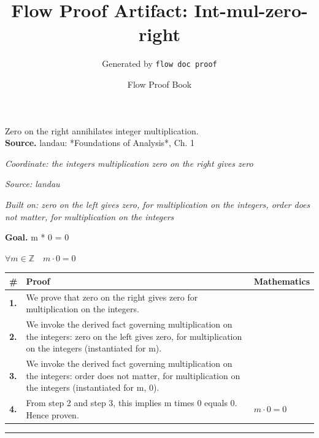 \documentclass[11pt]{article}
\title{Flow Proof Artifact: Int-mul-zero-right}
\author{Generated by \texttt{flow doc proof}}
\date{Flow Proof Book}
\theoremstyle{definition}
\begin{document}
\maketitle
Zero on the right annihilates integer multiplication.\\[0.5em]
\textbf{Source.} landau: *Foundations of Analysis*, Ch. 1\\[0.5em]
\bigskip
{}\par
\smallskip\noindent\textit{Coordinate: the integers \cdot multiplication \cdot zero on the right gives zero}\par
\smallskip\noindent\textit{Source: landau}\par
\smallskip\noindent\textit{Built on: zero on the left gives zero, for multiplication on the integers, order does not matter, for multiplication on the integers}\par
\medskip
\noindent\textbf{Goal.} m * 0 = 0\par
\noindent$\displaystyle \forall m \in \mathbb{Z}\quad m \cdot 0 = 0$\par
\medskip
\noindent
\begin{tabular}{@{} >{\raggedright\arraybackslash}p{} >{\raggedright\arraybackslash}p{} >{\raggedleft\arraybackslash}p{} @{}}
\textbf{\#} & \textbf{Proof} & \textbf{Mathematics} \\
\midrule
\textbf{1.} & We prove that zero on the right gives zero for multiplication on the integers. & \\[0.45em]
\textbf{2.} & We invoke the derived fact governing multiplication on the integers: zero on the left gives zero, for multiplication on the integers (instantiated for m). & \\[0.45em]
\textbf{3.} & We invoke the derived fact governing multiplication on the integers: order does not matter, for multiplication on the integers (instantiated for m, 0). & \\[0.45em]
\textbf{4.} & From step 2 and step 3, this implies m times 0 equals 0. Hence proven. & $\displaystyle m \cdot 0 = 0$ \\[0.45em]
\bottomrule
\end{tabular}
\label{thm:Int-multiplication-zero_on_the_right_gives_zero}
\par\medskip\hrule
\end{document}
